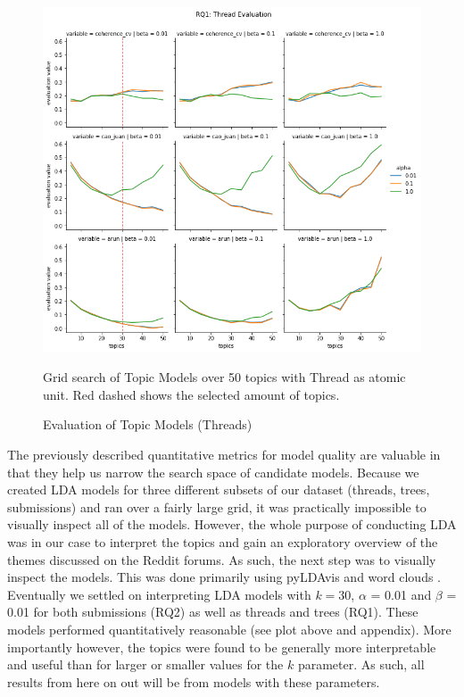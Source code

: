\documentclass{article}
\begin{document}
\begin{figure}[H]
    \begin{centering}
    \includegraphics[scale=0.4]{../Figure/H1_thread_red.png}
    \caption{Evaluation of Topic Models (Threads)}
    \end{centering}
    \begin{footnotesize} 
        Grid search of Topic Models over 50 topics with Thread as atomic unit. Red dashed shows the selected amount of topics. 
    \end{footnotesize}
\end{figure}

The previously described quantitative metrics for model quality are valuable in that they help us narrow the search space of candidate models. Because we created LDA models for three different subsets of our dataset (threads, trees, submissions) and ran over a fairly large grid, it was practically impossible to visually inspect all of the models. However, the whole purpose of conducting LDA was in our case to interpret the topics and gain an exploratory overview of the themes discussed on the Reddit forums. As such, the next step was to visually inspect the models. This was done primarily using pyLDAvis and word clouds \cite{sievert2014ldavis}. 
Eventually we settled on interpreting LDA models with $k = 30$, $\alpha$ = 0.01 and $\beta$ = 0.01 for both submissions (RQ2) as well as threads and trees (RQ1). These models performed quantitatively reasonable (see plot above and appendix). More importantly however, the topics were found to be generally more interpretable and useful than for larger or smaller values for the $k$ parameter. As such, all results from here on out will be from models with these parameters. 
\end{document}
